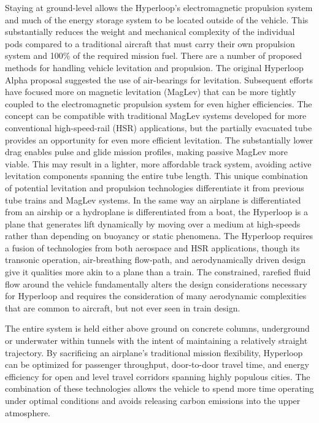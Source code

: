     Staying at ground-level allows the Hyperloop's electromagnetic propulsion
    system and much of the energy storage system to be located outside of the vehicle.
    This substantially reduces the weight and mechanical complexity of the
    individual pods compared to a traditional aircraft that must carry their
    own propulsion system and 100\% of the required mission fuel.
    There are a number of proposed methods for handling vehicle levitation and
    propulsion. The original Hyperloop Alpha proposal suggested the use of
    air-bearings for levitation.\cite{Musk}
    Subsequent efforts have focused more on magnetic levitation (MagLev) that
    can be more tightly coupled to the electromagnetic propulsion system for
    even higher efficiencies.
    The concept can be compatible with traditional MagLev systems developed for
    more conventional high-speed-rail (HSR) applications, but the partially
    evacuated tube provides an opportunity for even more efficient levitation.
    The substantially lower drag enables pulse and glide mission profiles,
    making passive MagLev more viable. This may result in a lighter, more affordable track
    system, avoiding active levitation components spanning the entire tube length.
    This unique combination of potential levitation and propulsion technologies
    differentiate it from previous tube trains and MagLev systems.
    In the same way an airplane is differentiated from an airship or a hydroplane
    is differentiated from a boat, the Hyperloop is a plane that generates lift
    dynamically by moving over a medium at high-speeds
    rather than depending on buoyancy or static phenomena.
    The Hyperloop requires a fusion of technologies from both aerospace and HSR
    applications, though its transonic operation, air-breathing flow-path, and
    aerodynamically driven design give it qualities more akin to a plane than a train.
    The constrained, rarefied fluid flow around the vehicle
    fundamentally alters the design considerations necessary for Hyperloop and
    requires the consideration of many aerodynamic complexities that
    are common to aircraft, but not ever seen in train design.

    The entire system is held either above ground on concrete
    columns, underground or underwater within tunnels with the intent of
    maintaining a relatively straight trajectory.
    By sacrificing an airplane's traditional mission flexibility,
    Hyperloop can be optimized for passenger throughput, door-to-door travel time,
    and energy efficiency for open and level travel corridors spanning highly
    populous cities. The combination of these technologies allows the
    vehicle to spend more time operating under optimal conditions and avoids
    releasing carbon emissions into the upper atmosphere.

